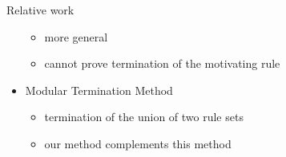 \documentclass{beamer}
\begin{document}
\begin{frame}{Relative work}
\begin{itemize}
            \begin{itemize}
                \item \alert{more general} 
                \item \alert{cannot prove termination of the motivating rule}
             \end{itemize} 
        \item Modular Termination Method~\cite{plump2018modular}
             \begin{itemize}
                \item termination of the union of two rule sets
                \item \alert{our method complements this method}
             \end{itemize}
    \end{itemize}
\end{frame}
\end{document}
